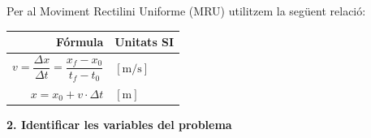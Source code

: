 \documentclass[12pt,a4paper]{article}
\begin{document}
{\color{black}
Per al Moviment Rectilini Uniforme (MRU) utilitzem la següent relació:
\begin{center}
\renewcommand{\arraystretch}{1.8}
\begin{tabular}{rl}
\hline
\textbf{Fórmula} & \textbf{Unitats SI} \\
\hline
{\color{blue}$v = \dfrac{\Delta x}{\Delta t} = \dfrac{x_f - x_0}{t_f - t_0}$} & {\color{blue}$[\text{m/s}]$} \\[1ex]
{\color{blue}$x = x_0 + v \cdot \Delta t$} & {\color{blue}$[\text{m}]$} \\
\hline
\end{tabular}
\end{center}
}

\vspace{0.5cm}

{\color{black}\textbf{\large 2. Identificar les variables del problema}}
\end{document}
